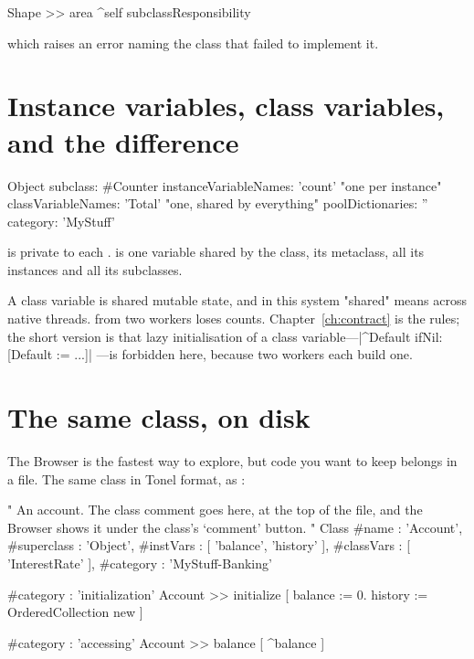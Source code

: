 \begin{st}
Shape >> area
    ^self subclassResponsibility
\end{st}

which raises an error naming the class that failed to implement it.

\section{Instance variables, class variables, and the difference}

\begin{st}
Object subclass: #Counter
    instanceVariableNames: 'count'        "one per instance"
    classVariableNames: 'Total'           "one, shared by everything"
    poolDictionaries: ''
    category: 'MyStuff'
\end{st}

 is private to each .  is one variable shared
by the class, its metaclass, all its instances and all its subclasses.

\begin{stwarn}
A class variable is shared mutable state, and in this system "shared" means
across native threads.  from two workers loses counts.
Chapter~\ref{ch:contract} is the rules; the short version is that lazy
initialisation of a class variable---\ct|^Default ifNil: [Default := ...]|
---is forbidden here, because two workers each build one.
\end{stwarn}

\section{The same class, on disk}

The Browser is the fastest way to explore, but code you want to keep belongs
in a file. The same class in Tonel format, as :

\begin{st}
"
An account.  The class comment goes here, at the top of the file, and the
Browser shows it under the class's `comment' button.
"
Class {
	#name : 'Account',
	#superclass : 'Object',
	#instVars : [ 'balance', 'history' ],
	#classVars : [ 'InterestRate' ],
	#category : 'MyStuff-Banking'
}

{ #category : 'initialization' }
Account >> initialize [
	balance := 0.
	history := OrderedCollection new
]

{ #category : 'accessing' }
Account >> balance [
	^balance
]
\end{st}


